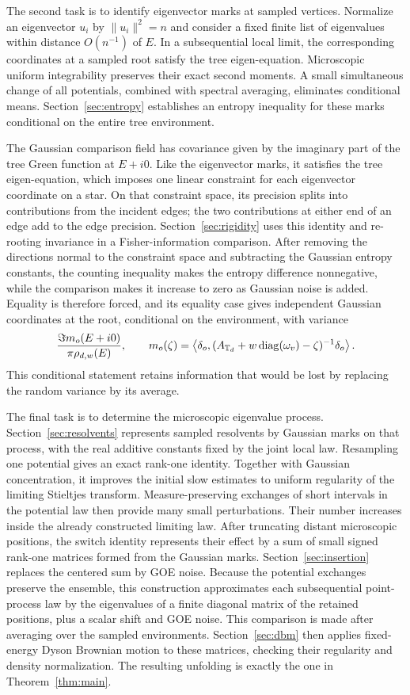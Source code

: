 The second task is to identify eigenvector marks at sampled vertices.
Normalize an eigenvector $u_i$ by $\|u_i\|^2=n$ and consider a fixed
finite list of eigenvalues within distance $O(n^{-1})$ of $E$.
In a subsequential local limit, the corresponding coordinates at a
sampled root satisfy the tree eigen-equation.  Microscopic uniform
integrability preserves their exact second moments.  A small simultaneous
change of all potentials, combined with spectral averaging, eliminates
conditional means.  Section~\ref{sec:entropy} establishes an entropy
inequality for these marks conditional on the entire tree environment.

The Gaussian comparison field has covariance given by the imaginary part
of the tree Green function at $E+i0$.  Like the eigenvector marks, it
satisfies the tree eigen-equation, which imposes one linear constraint
for each eigenvector coordinate on a star.  On that constraint space,
its precision splits into contributions
from the incident edges; the two contributions at either end of an edge
add to the edge precision.  Section~\ref{sec:rigidity} uses this identity
and re-rooting invariance in a Fisher-information comparison.  After
removing the directions normal to the constraint space and subtracting
the Gaussian entropy constants, the counting inequality makes the
entropy difference
nonnegative, while the comparison makes it increase to zero as Gaussian
noise is added.  Equality is therefore forced, and its equality case gives
independent Gaussian coordinates at the root, conditional on the
environment, with variance
\[
 \frac{\Im m_o(E+i0)}{\pi\rho_{d,w}(E)},
 \qquad
 m_o(\zeta)=\left\langle\delta_o,
 (A_{\mathbb T_d}+w\operatorname{diag}(\omega_v)-\zeta)^{-1}\delta_o\right\rangle.
\]
This conditional statement retains information that would be lost by
replacing the random variance by its average.

The final task is to determine the microscopic eigenvalue process.
Section~\ref{sec:resolvents} represents sampled resolvents by Gaussian
marks on that process, with the real additive constants fixed by the
joint local law.  Resampling one potential gives an exact rank-one
identity.  Together with Gaussian concentration, it improves the initial
slow estimates to uniform regularity of the limiting Stieltjes transform.
Measure-preserving exchanges of short intervals in the potential law
then provide many small perturbations.  Their number increases inside the
already constructed limiting law.  After truncating distant microscopic
positions, the switch identity represents their effect by a sum of small
signed rank-one matrices formed from the Gaussian marks.
Section~\ref{sec:insertion} replaces the centered sum by GOE noise.
Because the potential exchanges preserve the ensemble, this construction
approximates each subsequential point-process law by the eigenvalues of a
finite diagonal matrix of the retained positions, plus a scalar shift and
GOE noise.  This comparison is made after averaging over the sampled
environments.  Section~\ref{sec:dbm} then applies fixed-energy Dyson
Brownian motion to these matrices, checking their regularity and density
normalization.  The resulting unfolding is exactly the one in
Theorem~\ref{thm:main}.


